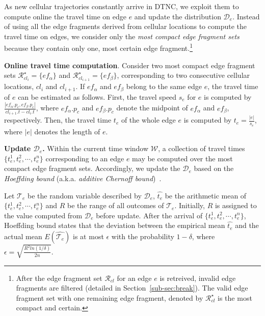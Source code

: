 \documentclass{vldb}
\begin{document}
	As new cellular trajectories constantly arrive in DTNC, we exploit them to compute online the travel time on edge $e$ and update the distribution $\mathcal{D}_e$. Instead of using all the edge fragments derived from cellular locations to compute the travel time on edges, we consider only the {\em most compact edge fragment sets} because they contain only one, most certain edge fragment.\footnote{After the edge fragment set $\mathcal{R}_{cl}$ for an edge $e$ is retreived, invalid edge fragments are filtered (detailed in Section~\ref{sub-sec:break}). The valid edge fragment set with one remaining edge fragment, denoted by $\mathcal{R}_{cl}^\star$ is the most compact and certain.}   
	
	\textbf{Online travel time computation}. %
	Consider two most compact edge fragment sets $\mathcal{R}_{cl_i}^\star=\{ef_\alpha\}$ and $\mathcal{R}_{cl_{i+1}}^\star=\{ef_\beta\}$, corresponding to two consecutive cellular locations, $cl_i$ and $cl_{i+1}$.
	If $ef_\alpha$ and $ef_\beta$ belong to the same edge $e$, the travel time of $e$ can be estimated as follows.
	First, the travel speed $s_e$ for $e$ is computed by $\frac{|ef_\alpha.p_c, ef_\beta.p_c|}{cl_{i+1}.t-cl_i.t}$, where $ef_\alpha.p_c$ and $ef_\beta.p_c$ denote the midpoint of $ef_\alpha$ and $ef_\beta$, respectively.
	Then, the travel time $t_e$ of the whole edge $e$ is computed by $t_e=\frac{|e|}{s_e}$, where $|e|$ denotes the length of $e$.
	
	\textbf{Update $\mathcal{D}_e$.} 
	Within the current time window $\mathcal{W}$, a collection of travel times $\{t_e^1, t_e^2, \cdots, t_e^n\}$ corresponding to an edge $e$ may be computed over the most compact edge fragment sets. %
	Accordingly, we update the $\mathcal{D}_e$ based on the \textit{Hoeffding bound} (a.k.a. \textit{additive Chernoff bound})~\cite{hoeffding1963probability}. 
	
	Let $\mathcal{T}_e$ be the random variable described by $\mathcal{D}_e$,  $\widehat{t_e}$ be the arithmetic mean of $\{t_e^1, t_e^2, \cdots, t_e^n\}$ and $R$ be the range of all outcomes of $\mathcal{T}_e$. 
	Initially, $R$ is assigned to the value computed from $\mathcal{D}_e$ before update. %
	After the arrival of $\{t_e^1, t_e^2, \cdots, t_e^n\}$, Hoeffding bound states that the deviation between the empirical mean $\widehat{t_e}$ and the actual mean $E(\widehat{\mathcal{T}_e})$ is at most $\epsilon$ with the probability $1-\delta$, where  $\epsilon=\sqrt{\frac{R^2ln(1/\delta)}{2n}}$. 
	
\end{document}
